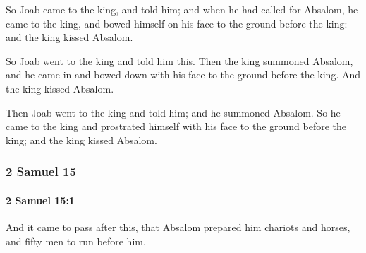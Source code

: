 			\begin{versebox}
					\item[BHS] 
					\item[ASV] So Joab came to the king, and told him; and when he had called for Absalom, he came to the king, and bowed himself on his face to the ground before the king: and the king kissed Absalom.
					\item[NIV] So Joab went to the king and told him this. Then the king summoned Absalom, and he came in and bowed down with his face to the ground before the king. And the king kissed Absalom.
					\item[NRSV] Then Joab went to the king and told him; and he summoned Absalom. So he came to the king and prostrated himself with his face to the ground before the king; and the king kissed Absalom.
			\end{versebox}
	\subsubsection{2 Samuel 15} %
		\label{2SAMUEL-15}

		\paragraph{2 Samuel 15:1} %
			\label{2SAMUEL-15-1}

			And it came to pass after this, that Absalom prepared him chariots and horses, and fifty men to run before him.

